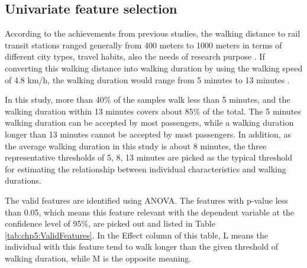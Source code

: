 %
\subsection{Univariate feature selection}
%
According to the achievements from previous studies, the walking distance to rail transit stations ranged generally from 400 meters to 1000 meters in terms of different city types, travel habits, also the needs of research purpose \cite{guerra2012half,murray1998public,o1996walking,keijer2000people,zhao2003forecasting,alshalalfah2007case}. If converting this walking distance into walking duration by using the walking speed of 4.8 km/h, the walking duration would range from 5 minutes to 13 minutes \cite{bohannon1997comfortable}. 

%
In this study, more than 40\% of the samples walk less than 5 minutes, and the walking duration within 13 minutes covers about 85\% of the total. The 5 minutes walking duration can be accepted by most passengers, while a walking duration longer than 13 minutes cannot be accepted by most passengers. In addition, as the average walking duration in this study is about 8 minutes, the three representative thresholds of 5, 8, 13 minutes are picked as the typical threshold for estimating the relationship between individual characteristics and walking durations. 

%
The valid features are identified using ANOVA. The features with p-value less than 0.05, which means this feature relevant with the dependent variable at the confidence level of 95\%, are picked out and listed in Table \ref{tab:chp5:ValidFeatures}. In the Effect column of this table, L means the individual with this feature tend to walk longer than the given threshold of walking duration, while M is the opposite meaning.

